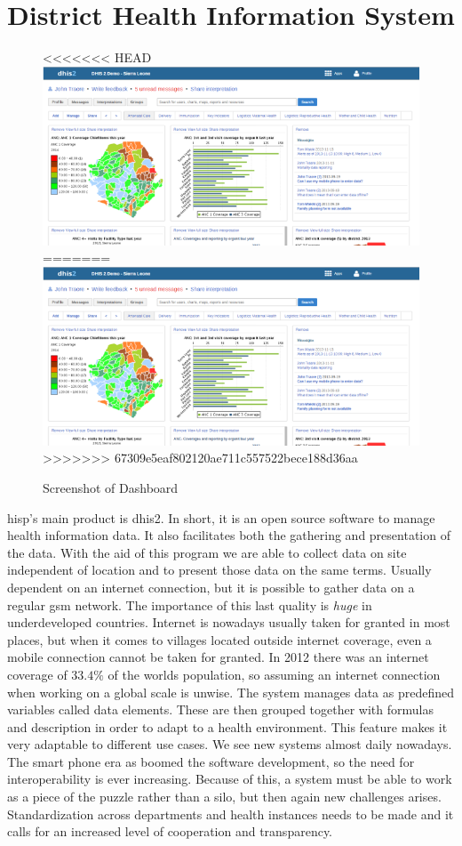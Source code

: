 \section{District Health Information System}
\begin{figure}
\centering
<<<<<<< HEAD
\includegraphics[width=\textwidth]{context/img/dhis2Dash}
=======
\includegraphics[width=\columnwidth]{context/img/dhis2Dash}
>>>>>>> 67309e5eaf802120ae711c557522bece188d36aa
\caption{Screenshot of Dashboard}
\label{fig:dash}
\end{figure}
\gls{hisp}'s main product is \gls{dhis2}. In short, it is an open source software to manage health information data. It also facilitates both the gathering and presentation of the data. With the aid of this program we are able to collect data on site independent of location and to present those data on the same terms. Usually dependent on an internet connection, but it is possible to gather data on a regular \gls{gsm} network. The importance of this last quality is \textit{huge} in underdeveloped countries. Internet is nowadays usually taken for granted in most places, but when it comes to villages located outside internet coverage, even a mobile connection cannot be taken for granted. In 2012 there was an internet coverage of $33.4\%$ of the worlds population, so assuming an internet connection when working on a global scale is unwise. The system manages data as predefined variables called data elements. These are then grouped together with formulas and description in order to adapt to a health environment. This feature makes it very adaptable to different use cases. We see new systems almost daily nowadays. The smart phone era as boomed the software development, so the need for interoperability is ever increasing. Because of this, a system must be able to work as a piece of the puzzle rather than a silo, but then again new challenges arises. Standardization across departments and health instances needs to be made and it calls for an increased level of cooperation and transparency.

